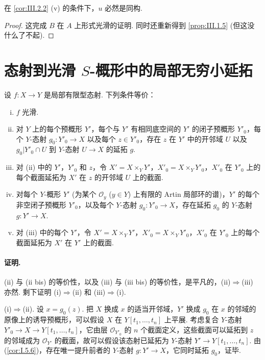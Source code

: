 \begin{corollary}\label{cor:III.2.3}
在 \ref{cor:III.2.2} (v) 的条件下，$u$ 必然是同构.
\end{corollary}

\begin{proof}
这完成 $B$ 在 $A$ 上形式光滑的证明. 同时还重新得到 \ref{prop:III.1.5} (但这没什么了不起).
\end{proof}

\section{态射到光滑 \texorpdfstring{$S$-概形}{S-概形}中的局部无穷小延拓}

\begin{theorem}\label{thm:III.3.1}
设 $f \colon X \to Y$ 是局部有限型态射. 下列条件等价：
\begin{enumerate}[(i)]
\item $f$ 光滑.
\item 对 $Y$ 上的每个预概形 $Y'$，每个与 $Y'$ 有相同底空间的 $Y'$ 的闭子预概形 $Y'_0$，每个 $Y$-态射 $g_0 \colon Y'_0 \to X$ 以及每个 $z \in Y'_0$，存在 $z$ 在 $Y'$ 中的开邻域 $U$ 以及 $g_0|Y'_0 \cap U$ 到 $Y$-态射 $U \to X$ 的延拓 $g$.
\item[(ii bis)] 对 (ii) 中的 $Y'$，$Y'_0$ 和 $z$，令 $X' = X \times_Y Y'$，$X'_0 = X \times_Y Y'_0$，$X'_0$ 在 $Y'_0$ 上的每个截面延拓为 $X'$ 在 $z$ 的开邻域 $U$ 上的截面.
\item 对每个 $Y$-概形 $Y'$ (为某个 $\mathcal{O}_y$ ($y \in Y$) 上有限的 Artin 局部环的谱)，$Y'$ 的每个非空闭子预概形 $Y'_0$，以及每个 $Y$-态射 $g_0 \colon Y'_0 \to X$，存在延拓 $g_0$ 的 $Y$-态射 $g \colon Y' \to X$.
\item[(iii bis)] 对 (iii) 中的每个 $Y'$，令 $X' = X \times_Y Y'$，$X'_0 = X \times_Y Y'_0$，$X'_0$ 在 $Y'_0$ 上的每个截面延拓为 $X'$ 在 $Y'$ 上的截面.
\end{enumerate}
\end{theorem}

\paragraph*{证明.} (ii) 与 (ii bis) 的等价性，以及 (iii) 与 (iii bis) 的等价性，是平凡的，(ii)$\Rightarrow$(iii) 亦然. 剩下证明 (i)$\Rightarrow$(ii) 和 (iii)$\Rightarrow$(i).

(i)$\Rightarrow$(ii). 设 $x = g_0(z)$. 把 $X$ 换成 $x$ 的适当开邻域，$Y'$ 换成 $g_0$ 在 $x$ 的邻域的原像上的诱导预概形，可以假设 $X$ 在 $Y[t_1, \dots, t_n]$ 上平展. 考虑复合 $Y$-态射 $Y'_0 \to X \to Y[t_1, \dots, t_n]$，它由层 $\mathcal{O}_{Y'_0}$ 的 $n$ 个截面定义，这些截面可以延拓到 $z$ 的邻域成为 $\mathcal{O}_{Y'}$ 的截面，故可以假设该态射已延拓为 $Y$-态射 $Y' \to Y[t_1, \dots, t_n]$. 由 (\ref{cor:I.5.6})，存在唯一提升前者的 $Y$-态射 $g \colon Y' \to X$，它同时延拓 $g_0$，证毕.

